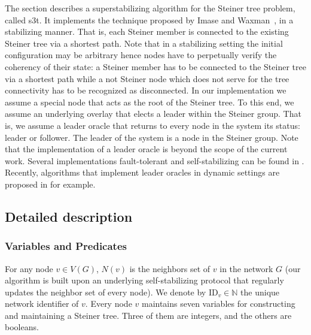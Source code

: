 \documentclass[11pt]{article}
\newcommand{\id}{\mbox{ID}}
\newcommand{\STT}{{\sc s3t}}
\begin{document}
The section describes a superstabilizing algorithm for the Steiner tree problem, called \STT.
It implements the
technique proposed by Imase and
Waxman~\cite{ImaseWaxman91},  in a stabilizing manner. That is, each Steiner member is connected
to the existing Steiner tree via a shortest path. Note that in a
stabilizing setting the initial configuration may be arbitrary hence
nodes have to perpetually verify the coherency of their state:
a Steiner member has to be connected to the Steiner
tree via a shortest path while a not Steiner node which does not
serve for the tree connectivity has to be recognized as disconnected.
In our implementation we assume a special node that acts as the root
of the Steiner tree. To this end, we assume an underlying overlay that elects a
leader within the Steiner group. That is, we assume a leader oracle that returns to every node
in the system its status: leader or follower. The leader of the system
is a node in the Steiner group. Note that the implementation of a
leader oracle is beyond the scope of the current work. Several
implementations fault-tolerant and self-stabilizing can be found in
\cite{DDF07}. Recently, algorithms that implement leader
oracles in dynamic settings are proposed in \cite{Baldoni08} for example.

\subsection{Detailed description}



\subsubsection{Variables and Predicates}

For any node $v \in V(G)$, $N(v)$ is the neighbors set of $v$ in the network $G$ (our algorithm is built upon an underlying self-stabilizing protocol that regularly updates the neighbor set of every node). We denote by $\id_v \in \mathbb{N}$ the unique network identifier of $v$. Every node $v$ maintains seven variables for constructing and maintaining a Steiner tree. Three of them are integers, and the others are booleans.
\end{document}
